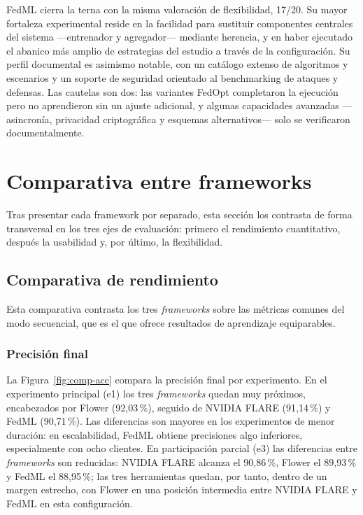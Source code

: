 FedML cierra la terna con la misma valoración de flexibilidad, 17/20. Su mayor fortaleza
experimental reside en la facilidad para sustituir componentes centrales del sistema
—entrenador y agregador— mediante herencia, y en haber ejecutado el abanico más amplio
de estrategias del estudio a través de la configuración. Su perfil documental es
asimismo notable, con un catálogo extenso de algoritmos y escenarios y un soporte de
seguridad orientado al benchmarking de ataques y defensas. Las cautelas son dos: las
variantes FedOpt completaron la ejecución pero no aprendieron sin un ajuste
adicional, y algunas capacidades avanzadas —asincronía, privacidad criptográfica y
esquemas alternativos— solo se verificaron documentalmente.

\section{Comparativa entre frameworks}\label{sec:comparativa-global}

Tras presentar cada framework por separado, esta sección los contrasta de forma
transversal en los tres ejes de evaluación: primero el rendimiento cuantitativo,
después la usabilidad y, por último, la flexibilidad.

\subsection{Comparativa de rendimiento}\label{sec:comparativa-frameworks}

Esta comparativa contrasta los tres \textit{frameworks} sobre las métricas comunes del modo
secuencial, que es el que ofrece resultados de aprendizaje equiparables.

\subsubsection{Precisión final}\label{sec:comp-precision}

La Figura~\ref{fig:comp-acc} compara la precisión final por experimento. En el experimento
principal (e1) los tres \textit{frameworks} quedan muy próximos, encabezados por Flower
(92{,}03\,\%), seguido de NVIDIA FLARE (91{,}14\,\%) y FedML (90{,}71\,\%). Las diferencias son
mayores en los experimentos de menor duración: en escalabilidad, FedML obtiene precisiones algo
inferiores, especialmente con ocho clientes. En participación parcial (e3) las diferencias entre
\textit{frameworks} son reducidas: NVIDIA FLARE alcanza el 90{,}86\,\%, Flower el 89{,}93\,\% y
FedML el 88{,}95\,\%; las tres herramientas quedan, por tanto, dentro de un margen estrecho, con
Flower en una posición intermedia entre NVIDIA FLARE y FedML en esta configuración.

